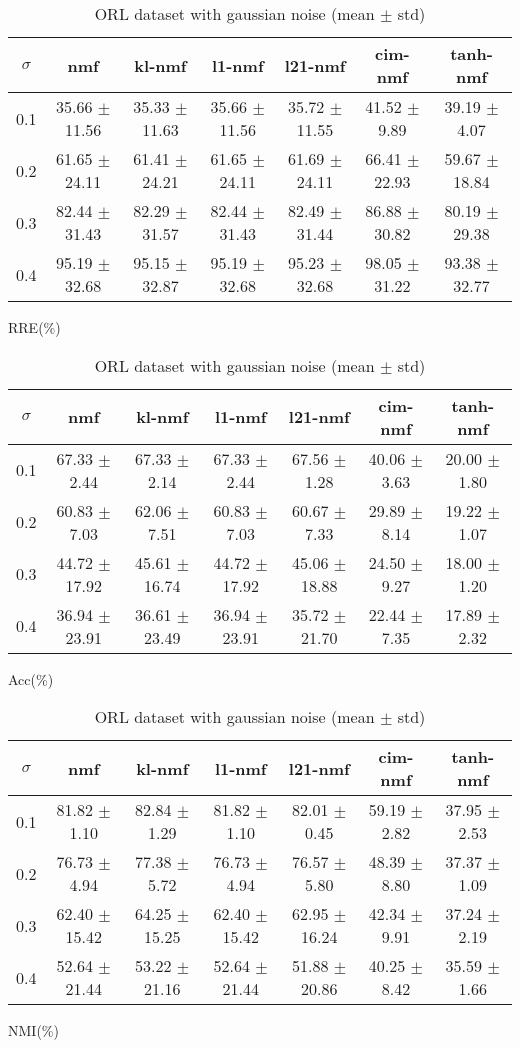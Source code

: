 \documentclass{article} %
\begin{document}
\begin{table}
\begin{subtable}{\linewidth}
\begin{tabular}{c|cccccc}$\sigma$ & nmf & kl-nmf & l1-nmf & l21-nmf & cim-nmf & tanh-nmf \\\hline
0.1 & 35.66 $\pm$ 11.56 & 35.33 $\pm$ 11.63 & 35.66 $\pm$ 11.56 & 35.72 $\pm$ 11.55 & 41.52 $\pm$ 9.89 & 39.19 $\pm$ 4.07 \\
0.2 & 61.65 $\pm$ 24.11 & 61.41 $\pm$ 24.21 & 61.65 $\pm$ 24.11 & 61.69 $\pm$ 24.11 & 66.41 $\pm$ 22.93 & 59.67 $\pm$ 18.84 \\
0.3 & 82.44 $\pm$ 31.43 & 82.29 $\pm$ 31.57 & 82.44 $\pm$ 31.43 & 82.49 $\pm$ 31.44 & 86.88 $\pm$ 30.82 & 80.19 $\pm$ 29.38 \\
0.4 & 95.19 $\pm$ 32.68 & 95.15 $\pm$ 32.87 & 95.19 $\pm$ 32.68 & 95.23 $\pm$ 32.68 & 98.05 $\pm$ 31.22 & 93.38 $\pm$ 32.77 \\
\end{tabular}\caption{RRE(\%)}\end{subtable}
\begin{subtable}{\linewidth}
\begin{tabular}{c|cccccc}$\sigma$ & nmf & kl-nmf & l1-nmf & l21-nmf & cim-nmf & tanh-nmf \\\hline
0.1 & 67.33 $\pm$ 2.44 & 67.33 $\pm$ 2.14 & 67.33 $\pm$ 2.44 & 67.56 $\pm$ 1.28 & 40.06 $\pm$ 3.63 & 20.00 $\pm$ 1.80 \\
0.2 & 60.83 $\pm$ 7.03 & 62.06 $\pm$ 7.51 & 60.83 $\pm$ 7.03 & 60.67 $\pm$ 7.33 & 29.89 $\pm$ 8.14 & 19.22 $\pm$ 1.07 \\
0.3 & 44.72 $\pm$ 17.92 & 45.61 $\pm$ 16.74 & 44.72 $\pm$ 17.92 & 45.06 $\pm$ 18.88 & 24.50 $\pm$ 9.27 & 18.00 $\pm$ 1.20 \\
0.4 & 36.94 $\pm$ 23.91 & 36.61 $\pm$ 23.49 & 36.94 $\pm$ 23.91 & 35.72 $\pm$ 21.70 & 22.44 $\pm$ 7.35 & 17.89 $\pm$ 2.32 \\
\end{tabular}\caption{Acc(\%)}\end{subtable}
\begin{subtable}{\linewidth}
\begin{tabular}{c|cccccc}$\sigma$ & nmf & kl-nmf & l1-nmf & l21-nmf & cim-nmf & tanh-nmf \\\hline
0.1 & 81.82 $\pm$ 1.10 & 82.84 $\pm$ 1.29 & 81.82 $\pm$ 1.10 & 82.01 $\pm$ 0.45 & 59.19 $\pm$ 2.82 & 37.95 $\pm$ 2.53 \\
0.2 & 76.73 $\pm$ 4.94 & 77.38 $\pm$ 5.72 & 76.73 $\pm$ 4.94 & 76.57 $\pm$ 5.80 & 48.39 $\pm$ 8.80 & 37.37 $\pm$ 1.09 \\
0.3 & 62.40 $\pm$ 15.42 & 64.25 $\pm$ 15.25 & 62.40 $\pm$ 15.42 & 62.95 $\pm$ 16.24 & 42.34 $\pm$ 9.91 & 37.24 $\pm$ 2.19 \\
0.4 & 52.64 $\pm$ 21.44 & 53.22 $\pm$ 21.16 & 52.64 $\pm$ 21.44 & 51.88 $\pm$ 20.86 & 40.25 $\pm$ 8.42 & 35.59 $\pm$ 1.66 \\
\end{tabular}\caption{NMI(\%)}\end{subtable}
\caption{ORL dataset with gaussian noise (mean $\pm$ std)}
\end{table}
\end{document}
